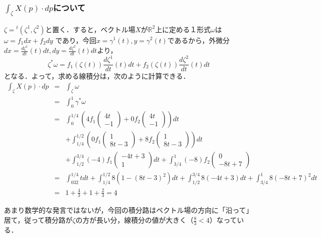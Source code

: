 \documentclass[dvipdfmx,nosetpagesize, uplatex]{jsarticle}
\theoremstyle{definition}
\theoremstyle{StatementsWithStar}
\theoremstyle{StatementsWithStar2}
\theoremstyle{StatementsWithStar3}
\theoremstyle{StatementsWithCCirc}
\theoremstyle{definition}
\begin{document}
\subsubsection*{$\int_{\zeta}X(p)\cdot dp$について}

$\zeta={}^t(\zeta^1,\zeta^2)$と置く．すると，ベクトル場$X$が$\mathbb{R}^2$上に定める１形式$\omega$は$\omega=f_1dx+f_2dy$
であり，今回$x=\gamma^1(t),y=\gamma^2(t)$であるから，外微分$dx=\frac{d\zeta^1}{dt}(t)dt, dy=\frac{d\zeta^2}{dt}(t)dt$より，
\[ \zeta^*\omega=f_1(\zeta(t))\frac{d\zeta^1}{dt}(t)dt+ f_2(\zeta(t))\frac{d\zeta^2}{dt}(t)dt \]
となる．よって，求める線積分は，次のように計算できる．
\begin{eqnarray*}
    \int_\zeta X(p)\cdot dp &=& \int_\zeta\omega \\
    &=& \int^1_0\gamma^*\omega \\
    &=& \int^{1/4}_0\left( 4f_1\left(\begin{array}{c}4t \\ -1\end{array}\right)+0f_2\left(\begin{array}{c}4t \\ -1\end{array}\right) \right)dt\\
    & & + \int^{1/2}_{1/4}\left( 0f_1\left(\begin{array}{c}1 \\ 8t-3\end{array}\right) + 8f_2\left(\begin{array}{c}1 \\ 8t-3\end{array}\right) \right) dt \\
    & & + \int^{3/4}_{1/2}(-4)f_1\left(\begin{array}{c}-4t+3 \\ 1\end{array}\right) dt + \int^1_{3/4} (-8)f_2\left(\begin{array}{c}0 \\ -8t+7\end{array}\right) \\
    &=& \int^{1/4}_032tdt+\int^{1/2}_{1/4}8(1-(8t-3)^2)dt+\int^{3/4}_{1/2}8(-4t+3)dt+\int^1_{3/4}8(-8t+7)^2dt\\
    &=& 1+\frac{4}{3}+1+\frac{2}{3} = \underline{4}
\end{eqnarray*}
\vspace{1cm}


あまり数学的な発言ではないが，今回の積分路はベクトル場の方向に「沿って」居て，従って積分路が$\zeta$の方が長い分，線積分の値が大きく（$\frac{8}{3}<4$）なっている．
\end{document}
